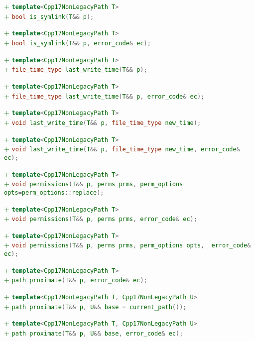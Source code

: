 \documentclass[11pt]{article}
\newcommand{\code}[2][cpp]{\lstinline[language=#1,basicstyle=\small\ttfamily]{#2}}
\newcommand{\tsreplace}[3]{\textcolor{red}{\sout{#1}}#2\textcolor{darkgreen}{#3}}
\begin{document}
\tsreplace{}{}{+ \code{template<Cpp17NonLegacyPath T>}}\\
\tsreplace{}{}{+ \code{bool is_symlink(T&& p);}}

\tsreplace{}{}{+ \code{template<Cpp17NonLegacyPath T>}}\\
\tsreplace{}{}{+ \code{bool is_symlink(T&& p, error_code& ec);}}

\tsreplace{}{}{+ \code{template<Cpp17NonLegacyPath T>}}\\
\tsreplace{}{}{+ \code{file_time_type last_write_time(T&& p);}}

\tsreplace{}{}{+ \code{template<Cpp17NonLegacyPath T>}}\\
\tsreplace{}{}{+ \code{file_time_type last_write_time(T&& p, error_code& ec);}}

\tsreplace{}{}{+ \code{template<Cpp17NonLegacyPath T>}}\\
\tsreplace{}{}{+ \code{void last_write_time(T&& p, file_time_type new_time);}}

\tsreplace{}{}{+ \code{template<Cpp17NonLegacyPath T>}}\\
\tsreplace{}{}{+ \code{void last_write_time(T&& p, file_time_type new_time, error_code& ec);}}

\tsreplace{}{}{+ \code{template<Cpp17NonLegacyPath T>}}\\
\tsreplace{}{}{+ \code{void permissions(T&& p, perms prms, perm_options opts=perm_options::replace);}}

\tsreplace{}{}{+ \code{template<Cpp17NonLegacyPath T>}}\\
\tsreplace{}{}{+ \code{void permissions(T&& p, perms prms, error_code& ec);}}

\tsreplace{}{}{+ \code{template<Cpp17NonLegacyPath T>}}\\
\tsreplace{}{}{+ \code{void permissions(T&& p, perms prms, perm_options opts,  error_code& ec);}}

\tsreplace{}{}{+ \code{template<Cpp17NonLegacyPath T>}}\\
\tsreplace{}{}{+ \code{path proximate(T&& p, error_code& ec);}}

\tsreplace{}{}{+ \code{template<Cpp17NonLegacyPath T, Cpp17NonLegacyPath U>}}\\
\tsreplace{}{}{+ \code{path proximate(T&& p, U&& base = current_path());}}

\tsreplace{}{}{+ \code{template<Cpp17NonLegacyPath T, Cpp17NonLegacyPath U>}}\\
\tsreplace{}{}{+ \code{path proximate(T&& p, U&& base, error_code& ec);}}
\end{document}
